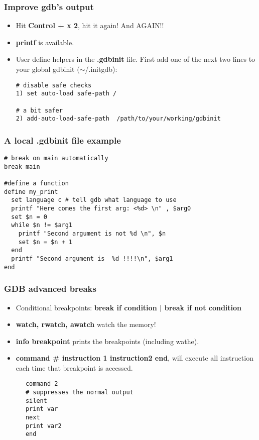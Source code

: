 \documentclass{beamer}
\begin{document}
\begin{frame}[fragile]
  \frametitle{Improve gdb's output}
  \begin{block}{}
    \begin{itemize} 
      \item Hit {\bf Control + x 2}, hit it again! And AGAIN!! 
      \item {\bf printf} is available.
      \item User define helpers in the {\bf .gdbinit} file.  First add
        one of the next two lines to your global gdbinit
        ($\sim$/.initgdb):\\
        \small{
          \begin{lstlisting}
# disable safe checks
1) set auto-load safe-path /

# a bit safer
2) add-auto-load-safe-path  /path/to/your/working/gdbinit 
        \end{lstlisting}}
    \end{itemize}
  \end{block}
\end{frame}

\begin{frame}[fragile]
  \frametitle{A local .gdbinit file example}
  \small{
  \begin{lstlisting}
# break on main automatically
break main

#define a function
define my_print
  set language c # tell gdb what language to use
  printf "Here comes the first arg: <%d> \n" , $arg0
  set $n = 0
  while $n != $arg1
    printf "Second argument is not %d \n", $n
    set $n = $n + 1
  end
  printf "Second argument is  %d !!!!\n", $arg1
end
  \end{lstlisting}
}
\end{frame}

\begin{frame}[fragile]\frametitle{GDB advanced breaks}
  \begin{block}{}
    \begin{itemize}
    \item Conditional breakpoints: {\bf break if condition | break if not condition}
    \item {\bf watch, rwatch, awatch} watch the memory!
    \item {\bf info breakpoint} prints the breakpoints (including wathe).
    \item {\bf command \# instruction 1\; instruction2\; end}, will execute all instruction each time that breakpoint is accessed.
    \end{itemize}
    \begin{lstlisting}
      command 2
      # suppresses the normal output
      silent 
      print var
      next
      print var2
      end
    \end{lstlisting}
  \end{block}
\end{frame}
\end{document}

